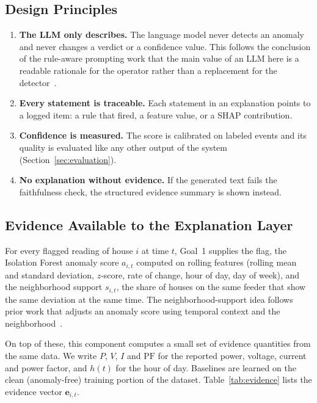 \documentclass[11pt,a4paper]{article}
\begin{document}
\subsection{Design Principles}
\begin{enumerate}[leftmargin=*,itemsep=2pt]
  \item \textbf{The LLM only describes.} The language model never detects an anomaly and never changes a verdict or a confidence value. This follows the conclusion of the rule-aware prompting work that the main value of an LLM here is a readable rationale for the operator rather than a replacement for the detector~\cite{ruleaware}.
  \item \textbf{Every statement is traceable.} Each statement in an explanation points to a logged item: a rule that fired, a feature value, or a SHAP contribution.
  \item \textbf{Confidence is measured.} The score is calibrated on labeled events and its quality is evaluated like any other output of the system (Section~\ref{sec:evaluation}).
  \item \textbf{No explanation without evidence.} If the generated text fails the faithfulness check, the structured evidence summary is shown instead.
\end{enumerate}

\subsection{Evidence Available to the Explanation Layer}
\label{sec:evidence}
For every flagged reading of house $i$ at time $t$, Goal~1 supplies the flag, the Isolation Forest anomaly
score $a_{i,t}$ computed on rolling features (rolling mean and standard deviation, $z$-score, rate of change, hour of day, day of week), and the neighborhood support $s_{i,t}$, the share of houses on the same feeder
that show the same deviation at the same time. The neighborhood-support idea follows prior work that adjusts an
anomaly score using temporal context and the neighborhood~\cite{multiuser}.

On top of these, this component computes a small set of evidence quantities from the same data.
We write $P$, $V$, $I$ and $\mathrm{PF}$ for the reported power, voltage, current and power factor, and
$h(t)$ for the hour of day. Baselines are learned on the clean (anomaly-free) training portion of the dataset.
Table~\ref{tab:evidence} lists the evidence vector $\mathbf{e}_{i,t}$.
\end{document}
